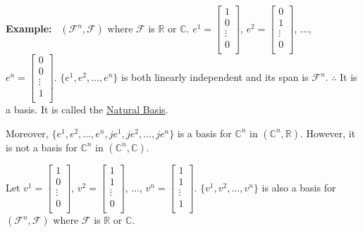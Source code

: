 \documentclass[letterpaper]{article}
\begin{document}
\noindent \textbf{Example:}~ $(\mathcal{F}^n,\mathcal{F})$ where $\mathcal{F}$ is $\mathbb{R}$ or $\mathbb{C}$. $e^1=\begin{bmatrix}
    1\\
    0\\
    \vdots\\
    0\\
    \end{bmatrix}$, $e^2=\begin{bmatrix}
    0\\
    1\\
    \vdots\\
    0\\
    \end{bmatrix}$, $\dots$, $e^n=\begin{bmatrix}
    0\\
    0\\
    \vdots\\
    1\\
    \end{bmatrix}$. $\{e^1,e^2,\dots,e^n\}$ is both linearly independent and its span is $\mathcal{F}^n$.
    \newline
    $\therefore$ It is a basis.
    \newline
    It is called the \underline{Natural Basis}.

    Moreover, $\{e^1,e^2,\dots,e^n,je^1,je^2,\dots,je^n\}$ is a basis for $\mathbb{C}^n$ in $(\mathbb{C}^n,\mathbb{R})$. However, it is not a basis for $\mathbb{C}^n$ in $(\mathbb{C}^n,\mathbb{C})$.

    Let $v^1=\begin{bmatrix}
    1\\
    0\\
    \vdots\\
    0\\
    \end{bmatrix}$, $v^2=\begin{bmatrix}
    1\\
    1\\
    \vdots\\
    0\\
    \end{bmatrix}$, $\dots$, $v^n=\begin{bmatrix}
    1\\
    1\\
    \vdots\\
    1\\
    \end{bmatrix}$. $\{v^1,v^2,\dots,v^n\}$ is also a basis for $(\mathcal{F}^n,\mathcal{F})$ where $\mathcal{F}$ is $\mathbb{R}$ or $\mathbb{C}$.
\end{document}
